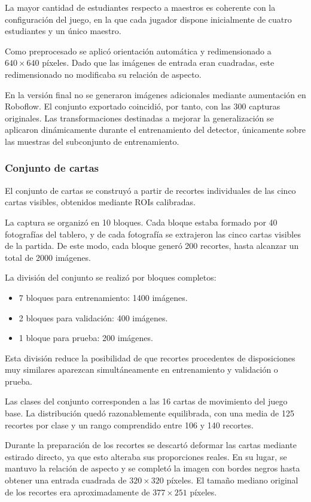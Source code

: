 La mayor cantidad de estudiantes respecto a maestros es coherente con la configuración del juego, en la que cada jugador dispone inicialmente de cuatro estudiantes y un único maestro.

Como preprocesado se aplicó orientación automática y redimensionado a $640\times640$ píxeles. Dado que las imágenes de entrada eran cuadradas, este redimensionado no modificaba su relación de aspecto.

En la versión final no se generaron imágenes adicionales mediante aumentación en Roboflow. El conjunto exportado coincidió, por tanto, con las 300 capturas originales. Las transformaciones destinadas a mejorar la generalización se aplicaron dinámicamente durante el entrenamiento del detector, únicamente sobre las muestras del subconjunto de entrenamiento.

\subsubsection*{Conjunto de cartas}

El conjunto de cartas se construyó a partir de recortes individuales de las cinco cartas visibles, obtenidos mediante ROIs calibradas.

La captura se organizó en 10 bloques. Cada bloque estaba formado por 40 fotografías del tablero, y de cada fotografía se extrajeron las cinco cartas visibles de la partida. De este modo, cada bloque generó 200 recortes, hasta alcanzar un total de 2000 imágenes.

La división del conjunto se realizó por bloques completos:

\begin{itemize}
    \item 7 bloques para entrenamiento: 1400 imágenes.
    \item 2 bloques para validación: 400 imágenes.
    \item 1 bloque para prueba: 200 imágenes.
\end{itemize}

Esta división reduce la posibilidad de que recortes procedentes de disposiciones muy similares aparezcan simultáneamente en entrenamiento y validación o prueba.

Las clases del conjunto corresponden a las 16 cartas de movimiento del juego base. La distribución quedó razonablemente equilibrada, con una media de 125 recortes por clase y un rango comprendido entre 106 y 140 recortes.

Durante la preparación de los recortes se descartó deformar las cartas mediante estirado directo, ya que esto alteraba sus proporciones reales. En su lugar, se mantuvo la relación de aspecto y se completó la imagen con bordes negros hasta obtener una entrada cuadrada de $320\times320$ píxeles. El tamaño mediano original de los recortes era aproximadamente de $377\times251$ píxeles.

